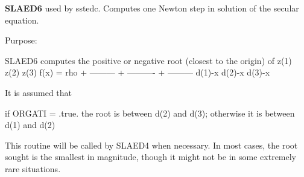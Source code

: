{\bfseries S\+L\+A\+E\+D6} used by sstedc. Computes one Newton step in solution of the secular equation. 

 \begin{DoxyParagraph}{Purpose\+: }
\begin{DoxyVerb} SLAED6 computes the positive or negative root (closest to the origin)
 of
                  z(1)        z(2)        z(3)
 f(x) =   rho + --------- + ---------- + ---------
                 d(1)-x      d(2)-x      d(3)-x

 It is assumed that

       if ORGATI = .true. the root is between d(2) and d(3);
       otherwise it is between d(1) and d(2)

 This routine will be called by SLAED4 when necessary. In most cases,
 the root sought is the smallest in magnitude, though it might not be
 in some extremely rare situations.\end{DoxyVerb}
 
\end{DoxyParagraph}

